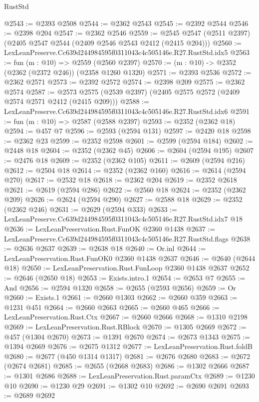 \begin{lexlean}{RustStd}
\begin{coremodule}
@2543 := @2393 @2508
@2544 := @2362 @2543
@2545 := @2392 @2544
@2546 := @2398 @204
@2547 := @2362 @2546
@2559 := @2545 @2547 (@2511 @2397) (@2405 @2547 @2544 (@2409 @2546 @2543 @2412 (@2415 @204)))
@2560 := LexLeanPreserve.Cc639d244984595f0311043c4c505146e.R27.RustStd.idx5
@2563 := fun (m : @10) => @2559 (@2560 @2397)
@2570 := (m : @10) -> @2352 (@2362 (@2372 @246)) (@2358 @1260 @1320)
@2571 := @2393 @2536
@2572 := @2362 @2571
@2573 := @2392 @2572
@2574 := @2398 @209
@2575 := @2362 @2574
@2587 := @2573 @2575 (@2539 @2397) (@2405 @2575 @2572 (@2409 @2574 @2571 @2412 (@2415 @209)))
@2588 := LexLeanPreserve.Cc639d244984595f0311043c4c505146e.R27.RustStd.idx6
@2591 := fun (m : @10) => @2587 (@2588 @2397)
@2593 := @2352 (@2362 @18)
@2594 := @457 @7
@2596 := @2593 (@2594 @131)
@2597 := @2420 @18
@2598 := @2362 @23
@2599 := @2352 @2598
@2601 := @2599 (@2594 @184)
@2602 := @2448 @18
@2604 := @2352 (@2362 @45)
@2606 := @2604 (@2594 @195)
@2607 := @2476 @18
@2609 := @2352 (@2362 @105)
@2611 := @2609 (@2594 @216)
@2612 := @2504 @18
@2614 := @2352 (@2362 @160)
@2616 := @2614 (@2594 @270)
@2617 := @2532 @18
@2618 := @2362 @204
@2619 := @2352 @2618
@2621 := @2619 (@2594 @286)
@2622 := @2560 @18
@2624 := @2352 (@2362 @209)
@2626 := @2624 (@2594 @290)
@2627 := @2588 @18
@2629 := @2352 (@2362 @246)
@2631 := @2629 (@2594 @333)
@2633 := LexLeanPreserve.Cc639d244984595f0311043c4c505146e.R27.RustStd.idx7 @18
@2636 := LexLeanPreservation.Rust.FunOK @2360 @1438
@2637 := LexLeanPreserve.Cc639d244984595f0311043c4c505146e.R27.RustStd.flags
@2638 := @2636 @2637
@2639 := @2638 @18
@2640 := Or.inl
@2644 := LexLeanPreservation.Rust.FunOK0 @2360 @1438 @2637
@2646 := @2640 (@2644 @18)
@2650 := LexLeanPreservation.Rust.FunLoop @2360 @1438 @2637
@2652 := @2646 (@2650 @18)
@2653 := Exists.intro.{1}
@2654 := @2653 @7
@2655 := And
@2656 := @2594 @1320
@2658 := @2655 (@2593 @2656)
@2659 := Or
@2660 := Exists.{1}
@2661 := @2660 @1303
@2662 := @2660 @359
@2663 := @1231 @451
@2664 := @2660 @2663
@2665 := @2660 @465
@2666 := LexLeanPreservation.Rust.Ctx
@2667 := @2660 @2666
@2668 := @1310 @2198
@2669 := LexLeanPreservation.Rust.RBlock
@2670 := @1305 @2669
@2672 := @457 (@1304 @2670)
@2673 := @1391 @2670
@2674 := @2673 @1343
@2675 := @1394 @2669
@2676 := @2675 @1312
@2677 := LexLeanPreservation.Rust.foldB
@2680 := @2677 (@450 @1314 @1317)
@2681 := @2676 @2680
@2683 := @2672 (@2674 @2681)
@2685 := @2655 (@2668 @2683)
@2686 := @1302 @2666
@2687 := @1301 @2686
@2688 := LexLeanPreservation.Rust.paramCtx
@2689 := @1230 @10
@2690 := @1230 @29
@2691 := @1302 @10
@2692 := @2690 @2691
@2693 := @2689 @2692

\end{coremodule}
\end{lexlean}

